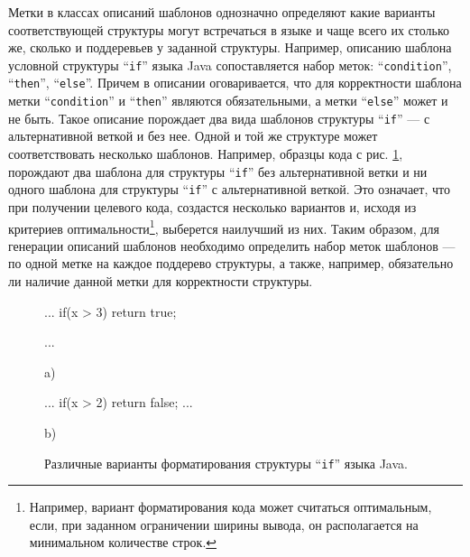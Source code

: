 \documentclass{matmex-diploma}
\begin{document}
Метки в классах описаний шаблонов однозначно определяют какие варианты соответствующей структуры могут встречаться в языке и чаще всего их столько же, сколько и поддеревьев у заданной структуры. Например, описанию шаблона условной структуры “\lstinline{if}” языка Java сопоставляется набор меток: “\lstinline{condition}”, “\lstinline{then}”, “\lstinline{else}”. Причем в описании оговаривается, что для корректности шаблона метки “\lstinline{condition}” и “\lstinline{then}” являются обязательными, а метки “\lstinline{else}” может и не быть. Такое описание порождает два вида шаблонов структуры “\lstinline{if}” --- с альтернативной веткой и без нее. Одной и той же структуре может соответствовать несколько шаблонов. Например, образцы кода с рис. \ref{ifVariants}, порождают два шаблона для структуры “\lstinline{if}” без альтернативной ветки и ни одного шаблона для структуры “\lstinline{if}” с альтернативной веткой. Это означает, что при получении целевого кода, создастся несколько вариантов и, исходя из критериев оптимальности\footnote{Например, вариант форматирования кода может считаться оптимальным, если, при заданном ограничении ширины вывода, он располагается на минимальном количестве строк.}, выберется наилучший из них. Таким образом, для генерации описаний шаблонов необходимо определить набор меток шаблонов --- по одной метке на каждое поддерево структуры, а также, например, обязательно ли наличие данной метки для корректности структуры.

\begin{figure}[ht]
\noindent\begin{minipage}{.45\textwidth}
    \begin{pyglist}[language=java,numbers=left,numbersep=5pt]
    ...
    if(x > 3) {
      return true;
    }
    
    ...
    \end{pyglist}
\caption*{a)}    
\end{minipage}\hfill
\begin{minipage}{.45\textwidth}
    \begin{pyglist}[language=java,numbers=left,numbersep=5pt]
    ...
    if(x > 2) 
    { 
      return false; 
    }
    ...
    \end{pyglist}
\caption*{b)}    
\end{minipage}
\caption{Различные варианты форматирования структуры “\lstinline{if}” языка Java.}    
\label{ifVariants}
\end{figure}
\end{document}

